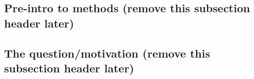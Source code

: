 \documentclass[%
preprint,                                  %
nofootinbib,
 amsmath,amssymb,
 aps,
]{revtex4-1}
\begin{document}

\subsection{\label{sec:intro.pre}Pre-intro to methods (remove this subsection header later)}



\subsection{\label{sec:intro.question}The question/motivation (remove this subsection header later)}

\end{document}
